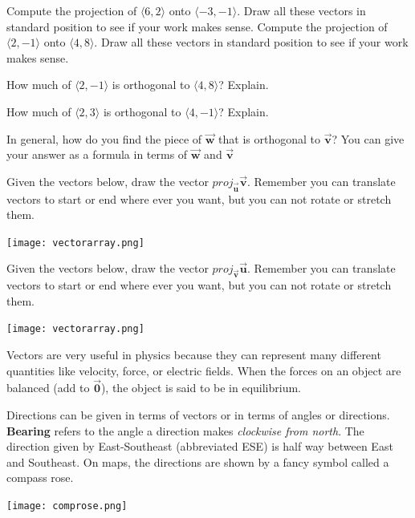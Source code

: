 \bq Compute the projection of $\langle 6,2\rangle$ onto $\langle -3,-1\rangle$. Draw all these vectors in standard position to see if your work makes sense.
\eq
\bq Compute the projection of $\langle 2,-1\rangle$ onto $\langle 4,8\rangle$. Draw all these vectors in standard position to see if your work makes sense.
\eq

\bq How much of $\langle 2,-1\rangle$ is orthogonal to $\langle 4,8\rangle$? Explain.
\eq

\bq How much of $\langle 2,3\rangle$ is orthogonal to $\langle 4,-1\rangle$? Explain.
\eq

\bq In general, how do you find the piece of $\vec{\textbf{w}}$ that is orthogonal to $\vec{\textbf{v}}$? You can give your answer as a formula in terms of $\vec{\textbf{w}}$ and $\vec{\textbf{v}}$
\eq

\bq Given the vectors below, draw the vector $proj_{\vec{\textbf{u}}} \vec{\textbf{v}}$. Remember you can translate vectors to start or end where ever you want, but you can not rotate or stretch them.

\begin{center} \texttt{[image: vectorarray.png]} \end{center}
\eq
\bq Given the vectors below, draw the vector $proj_{\vec{\textbf{v}}} \vec{\textbf{u}}$. Remember you can translate vectors to start or end where ever you want, but you can not rotate or stretch them.

\begin{center} \texttt{[image: vectorarray.png]} \end{center}
\eq


\begin{info} Vectors are very useful in physics because they can represent many different quantities like velocity, force, or electric fields. When the forces on an object are balanced (add to $\vec{\textbf{0}}$), the object is said to be in equilibrium.

Directions can be given in terms of vectors or in terms of angles or directions. \textbf{Bearing} refers to the angle a direction makes \emph{clockwise from north}. The direction given by East-Southeast (abbreviated ESE) is half way between East and Southeast. On maps, the directions are shown by a fancy symbol called a compass rose.

\begin{center} \texttt{[image: comprose.png]} \end{center}
\end{info}

